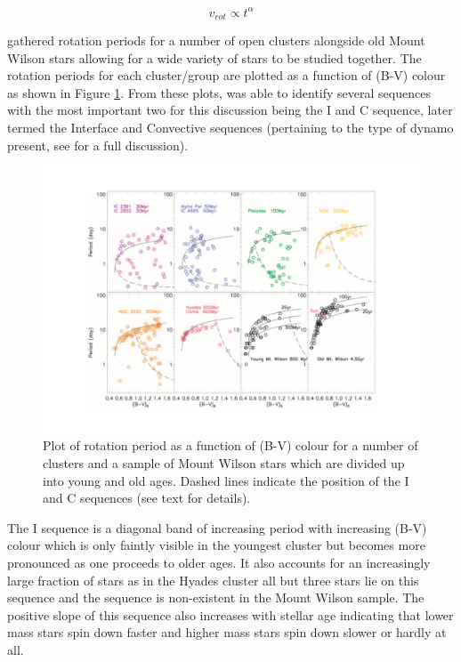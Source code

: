 \begin{equation}
    v_{rot} \propto t^{\alpha}
    \label{Eq:general_rotation_age}
\end{equation}

\citet{Barnes_2003} gathered rotation periods for a number of open clusters alongside old Mount Wilson stars allowing for a wide variety of stars to be studied together. The rotation periods for each cluster/group are plotted as a function of (B-V) colour as shown in Figure \ref{fig:barnes_2003_plot}. From these plots, \citet{Barnes_2003} was able to identify several sequences with the most important two for this discussion being the I and C sequence, later termed the Interface and Convective sequences (pertaining to the type of dynamo present, see \citet{Barnes_2003} for a full discussion).

\begin{figure}
    \centering
    \includegraphics[scale=0.5]{Figures/2-Historical_overview/barnes_2003.pdf}
    \caption[Rotation period as function of colour for a number of clusters]{Plot of rotation period as a function of (B-V) colour for a number of clusters and a sample of Mount Wilson stars which are divided up into young and old ages. Dashed lines indicate the position of the I and C sequences (see text for details).}
    \label{fig:barnes_2003_plot}
\end{figure}

The I sequence is a diagonal band of increasing period with increasing (B-V) colour which is only faintly visible in the youngest cluster but becomes more pronounced as one proceeds to older ages. It also accounts for an increasingly large fraction of stars as in the Hyades cluster all but three stars lie on this sequence and the sequence is non-existent in the Mount Wilson sample. The positive slope of this sequence also increases with stellar age indicating that lower mass stars spin down faster and higher mass stars spin down slower or hardly at all.

